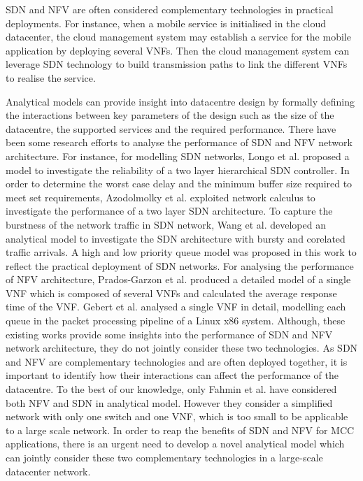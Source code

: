 SDN and NFV are often considered complementary technologies \cite{MatiasGTUJ15} in practical deployments. For instance, when a mobile service is initialised in the cloud datacenter, the cloud management system may establish a service for the mobile application by deploying several VNFs. Then the cloud management system can leverage SDN technology to build transmission paths to link the different VNFs to realise the service. 

Analytical models can provide insight into datacentre design by formally defining the interactions between key parameters of the design such as the size of the datacentre, the supported services and the required performance. There have been some research efforts to analyse the performance of SDN and NFV network architecture. For instance, for modelling SDN networks, Longo et al. \cite{LongoDBS15} proposed a model to investigate the reliability of a two layer hierarchical SDN controller. In order to determine the worst case delay and the minimum buffer size required to meet set requirements, Azodolmolky et al. \cite{AzodolmolkyWY13} exploited network calculus to investigate the performance of a two layer SDN architecture. To capture the burstness of the network traffic in SDN network, Wang et al. \cite{MiaoMWWH16} developed an analytical model to investigate the SDN architecture with bursty and corelated traffic arrivals. A high and low priority queue model was proposed in this work to reflect the practical deployment of SDN networks. For analysing the performance of NFV architecture, Prados-Garzon et al. \cite{Prados-GarzonAR17} produced a detailed model of a single VNF which is composed of several VNFs and calculated the average response time of the VNF. Gebert et al. \cite{GebertZLST16} analysed a single VNF in detail, modelling each queue in the packet processing pipeline of a Linux x86 system. Although, these existing works provide some insights into the performance of SDN and NFV network architecture, they do not jointly consider these two technologies. As SDN and NFV are complementary technologies and are often deployed together, it is important to identify how their interactions can affect the performance of the datacentre. To the best of our knowledge, only Fahmin et al. \cite{FahminLHLS17} have considered both NFV and SDN in analytical model. However they consider a simplified network with only one switch and one VNF, which is too small to be applicable to a large scale network. In order to reap the benefits of SDN and NFV for MCC applications, there is an urgent need to develop a novel analytical model which can jointly consider these two complementary technologies in a large-scale datacenter network. 

